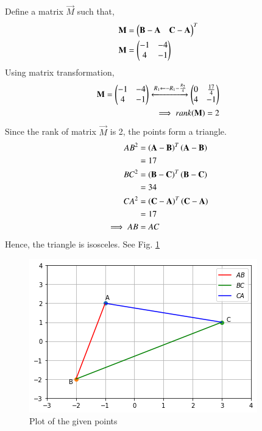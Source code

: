 
Define a matrix $\vec{M}$ such that,
\begin{align}
    \mathbf{M} &= \begin{pmatrix}\mathbf{B-A} & \mathbf{C-A}\end{pmatrix}^T\\
    \mathbf{M} &= \begin{pmatrix}-1 & -4\\4 & -1\end{pmatrix}
\end{align}
Using matrix transformation,
\begin{align}
    \mathbf{M} = \begin{pmatrix}-1 & -4\\4 & -1\end{pmatrix}\xleftrightarrow{R_1\leftarrow -R_1 - \frac{R_2}{4}} \begin{pmatrix}0 & \frac{17}{4}\\4 & -1\end{pmatrix}\\
    \implies rank(\mathbf{M}) = 2
\end{align}
Since the rank of matrix $\vec{M}$ is 2, the points form a triangle.
\begin{align}
    AB^2 &= \left(\mathbf{A} - \mathbf{B}\right)^T\left(\mathbf{A} - \mathbf{B}\right)\\
    &= 17\\
    BC^2 &= \left(\mathbf{B} - \mathbf{C}\right)^T\left(\mathbf{B} - \mathbf{C}\right)\\
    &= 34
    \\
    CA^2 &= \left(\mathbf{C} - \mathbf{A}\right)^T\left(\mathbf{C} - \mathbf{A}\right)\\
    &= 17
    \\
    \implies AB &= AC
\end{align}
Hence, the triangle is isosceles.  See Fig.     \ref{rams/1/1/6fig:plot}
\begin{figure}[htp]
    \centering
    \includegraphics[width=\columnwidth]{solutions/1/1/6/Figures/Fig1.png}
    \caption{Plot of the given points}
    \label{rams/1/1/6fig:plot}
\end{figure}

